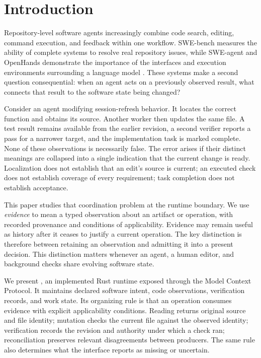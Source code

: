 \section{Introduction}
\label{sec:introduction}
Repository-level software agents increasingly combine code search, editing, command execution, and feedback within one workflow. SWE-bench measures the ability of complete systems to resolve real repository issues, while SWE-agent and OpenHands demonstrate the importance of the interfaces and execution environments surrounding a language model \cite{jimenez2024swebench,yang2024sweagent,wang2025openhands}. These systems make a second question consequential: when an agent acts on a previously observed result, what connects that result to the software state being changed?

Consider an agent modifying session-refresh behavior. It locates the correct function and obtains its source. Another worker then updates the same file. A test result remains available from the earlier revision, a second verifier reports a pass for a narrower target, and the implementation task is marked complete. None of these observations is necessarily false. The error arises if their distinct meanings are collapsed into a single indication that the current change is ready. Localization does not establish that an edit's source is current; an executed check does not establish coverage of every requirement; task completion does not establish acceptance.

This paper studies that coordination problem at the runtime boundary. We use \emph{evidence} to mean a typed observation about an artifact or operation, with recorded provenance and conditions of applicability. Evidence may remain useful as history after it ceases to justify a current operation. The key distinction is therefore between retaining an observation and admitting it into a present decision. This distinction matters whenever an agent, a human editor, and background checks share evolving software state.

We present \wcode{}, an implemented Rust runtime exposed through the Model Context Protocol. It maintains declared software intent, code observations, verification records, and work state. Its organizing rule is that an operation consumes evidence with explicit applicability conditions. Reading returns original source and file identity; mutation checks the current file against the observed identity; verification records the revision and authority under which a check ran; reconciliation preserves relevant disagreements between producers. The same rule also determines what the interface reports as missing or uncertain.

